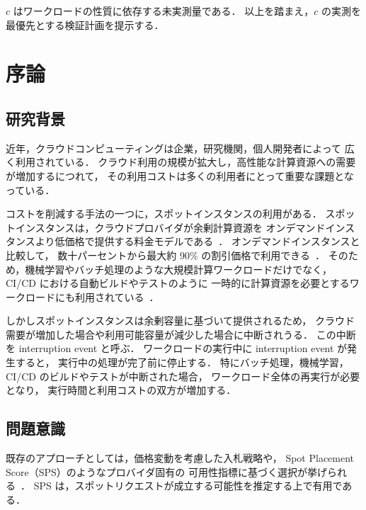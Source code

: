 \documentclass[11pt,a4paper]{ltjsreport}
\begin{document}
$c$ はワークロードの性質に依存する未実測量である．
以上を踏まえ，$c$ の実測を最優先とする検証計画を提示する．

\tableofcontents
\listoffigures
\listoftables

\chapter{序論}

\section{研究背景}

近年，クラウドコンピューティングは企業，研究機関，個人開発者によって
広く利用されている．
クラウド利用の規模が拡大し，高性能な計算資源への需要が増加するにつれて，
その利用コストは多くの利用者にとって重要な課題となっている．

コストを削減する手法の一つに，スポットインスタンスの利用がある．
スポットインスタンスは，クラウドプロバイダが余剰計算資源を
オンデマンドインスタンスより低価格で提供する料金モデルである~\cite{AWSSpot}．
オンデマンドインスタンスと比較して，
数十パーセントから最大約 90\% の割引価格で利用できる~\cite{Lin2022Survey}．
そのため，機械学習やバッチ処理のような大規模計算ワークロードだけでなく，
CI/CD における自動ビルドやテストのように
一時的に計算資源を必要とするワークロードにも利用されている~\cite{Ramesh2025}．

しかしスポットインスタンスは余剰容量に基づいて提供されるため，
クラウド需要が増加した場合や利用可能容量が減少した場合に中断されうる．
この中断を interruption event と呼ぶ．
ワークロードの実行中に interruption event が発生すると，
実行中の処理が完了前に停止する．
特にバッチ処理，機械学習，CI/CD のビルドやテストが中断された場合，
ワークロード全体の再実行が必要となり，
実行時間と利用コストの双方が増加する．

\section{問題意識}

既存のアプローチとしては，価格変動を考慮した入札戦略や，
Spot Placement Score（SPS）のようなプロバイダ固有の
可用性指標に基づく選択が挙げられる~\cite{Garg2025,Katayama2022}．
SPS は，スポットリクエストが成立する可能性を推定する上で有用である．
\end{document}
